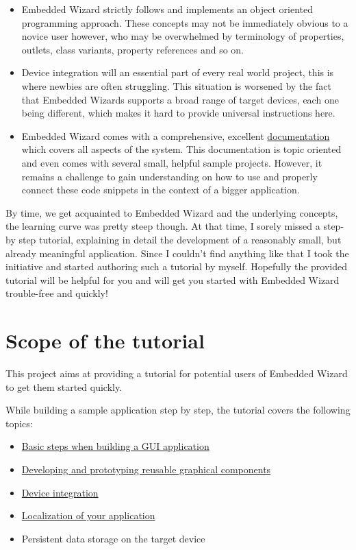 \documentclass[
  a4paper,
,tablecaptionabove
]{scrbook}
\begin{document}
\begin{itemize}
\item
  Embedded Wizard strictly follows and implements an object oriented
  programming approach. These concepts may not be immediately obvious to
  a novice user however, who may be overwhelmed by terminology of
  properties, outlets, class variants, property references and so on.
\item
  Device integration will an essential part of every real world project,
  this is where newbies are often struggling. This situation is worsened
  by the fact that Embedded Wizards supports a broad range of target
  devices, each one being different, which makes it hard to provide
  universal instructions here.
\item
  Embedded Wizard comes with a comprehensive, excellent
  \href{http://doc.embedded-wizard.de}{documentation} which covers all
  aspects of the system. This documentation is topic oriented and even
  comes with several small, helpful sample projects. However, it remains
  a challenge to gain understanding on how to use and properly connect
  these code snippets in the context of a bigger application.
\end{itemize}

By time, we get acquainted to Embedded Wizard and the underlying
concepts, the learning curve was pretty steep though. At that time, I
sorely missed a step-by step tutorial, explaining in detail the
development of a reasonably small, but already meaningful application.
Since I couldn't find anything like that I took the initiative and
started authoring such a tutorial by myself. Hopefully the provided
tutorial will be helpful for you and will get you started with Embedded
Wizard trouble-free and quickly!

\hypertarget{_scope_of_the_tutorial}{%
\section{Scope of the tutorial}\label{_scope_of_the_tutorial}}

This project aims at providing a tutorial for potential users of
Embedded Wizard to get them started quickly.

While building a sample application step by step, the tutorial covers
the following topics:

\begin{itemize}
\item
  \href{https://deining.github.io/EmWiTutorial/EmWiTutorial/latest/HelloWorld.html}{Basic
  steps when building a GUI application}
\item
  \href{https://deining.github.io/EmWiTutorial/EmWiTutorial/latest/ComponentReusability.html}{Developing
  and prototyping reusable graphical components}
\item
  \href{https://deining.github.io/EmWiTutorial/EmWiTutorial/latest/DeviceIntegrationBrowser.html}{Device
  integration}
\item
  \href{https://deining.github.io/EmWiTutorial/EmWiTutorial/latest/LocalizingYourApplication.html}{Localization
  of your application}
\item
  Persistent data storage on the target device
\end{itemize}
\end{document}
